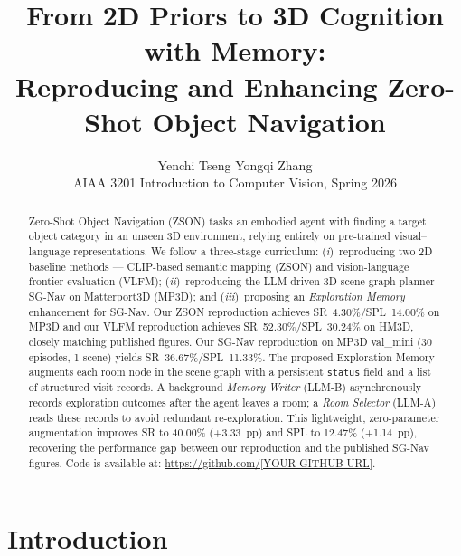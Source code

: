 \documentclass[10pt,twocolumn,letterpaper]{article}
\begin{document}
\title{From 2D Priors to 3D Cognition with Memory:\\
Reproducing and Enhancing Zero-Shot Object Navigation}

\author{Yenchi Tseng \quad Yongqi Zhang \\
AIAA 3201 Introduction to Computer Vision, Spring 2026 \\
}

\maketitle
\thispagestyle{empty}

\begin{abstract}
Zero-Shot Object Navigation (ZSON) tasks an embodied agent with finding a
target object category in an unseen 3D environment, relying entirely on
pre-trained visual--language representations.
We follow a three-stage curriculum: (\textit{i})~reproducing two 2D baseline
methods --- CLIP-based semantic mapping (ZSON) and vision-language frontier
evaluation (VLFM); (\textit{ii})~reproducing the LLM-driven 3D scene graph
planner SG-Nav on Matterport3D (MP3D); and (\textit{iii})~proposing an
\emph{Exploration Memory} enhancement for SG-Nav.
Our ZSON reproduction achieves SR~4.30\%/SPL~14.00\% on MP3D and our VLFM
reproduction achieves SR~52.30\%/SPL~30.24\% on HM3D, closely matching
published figures.
Our SG-Nav reproduction on MP3D val\_mini (30 episodes, 1 scene) yields
SR~36.67\%/SPL~11.33\%.
The proposed Exploration Memory augments each room node in the scene graph
with a persistent \texttt{status} field and a list of structured visit records.
A background \emph{Memory Writer} (LLM-B) asynchronously records exploration
outcomes after the agent leaves a room; a \emph{Room Selector} (LLM-A) reads
these records to avoid redundant re-exploration.
This lightweight, zero-parameter augmentation improves SR to 40.00\%
(+3.33~pp) and SPL to 12.47\% (+1.14~pp), recovering the performance gap
between our reproduction and the published SG-Nav figures.
Code is available at: \url{https://github.com/[YOUR-GITHUB-URL]}.
\end{abstract}

\section{Introduction}
\end{document}
